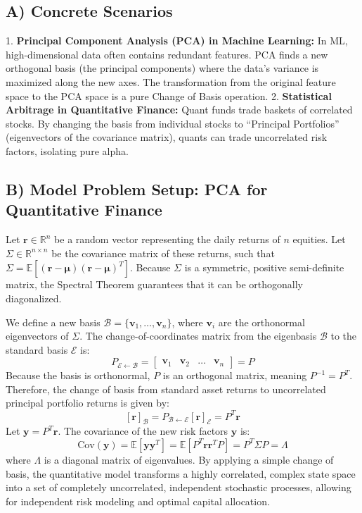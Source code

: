 \documentclass[11pt]{article}
\begin{document}
\subsection{A) Concrete Scenarios}
1. \textbf{Principal Component Analysis (PCA) in Machine Learning:} In ML, high-dimensional data often contains redundant features. PCA finds a new orthogonal basis (the principal components) where the data's variance is maximized along the new axes. The transformation from the original feature space to the PCA space is a pure Change of Basis operation.
2. \textbf{Statistical Arbitrage in Quantitative Finance:} Quant funds trade baskets of correlated stocks. By changing the basis from individual stocks to ``Principal Portfolios'' (eigenvectors of the covariance matrix), quants can trade uncorrelated risk factors, isolating pure alpha.

\subsection{B) Model Problem Setup: PCA for Quantitative Finance}
Let $\mathbf{r} \in \mathbb{R}^n$ be a random vector representing the daily returns of $n$ equities. Let $\Sigma \in \mathbb{R}^{n \times n}$ be the covariance matrix of these returns, such that $\Sigma = \mathbb{E}[(\mathbf{r} - \boldsymbol{\mu})(\mathbf{r} - \boldsymbol{\mu})^T]$. Because $\Sigma$ is a symmetric, positive semi-definite matrix, the Spectral Theorem guarantees that it can be orthogonally diagonalized.

We define a new basis $\mathcal{B} = \{\mathbf{v}_1, \dots, \mathbf{v}_n\}$, where $\mathbf{v}_i$ are the orthonormal eigenvectors of $\Sigma$. The change-of-coordinates matrix from the eigenbasis $\mathcal{B}$ to the standard basis $\mathcal{E}$ is:
\[ P_{\mathcal{E} \leftarrow \mathcal{B}} = \begin{bmatrix} \mathbf{v}_1 & \mathbf{v}_2 & \dots & \mathbf{v}_n \end{bmatrix} = P \]
Because the basis is orthonormal, $P$ is an orthogonal matrix, meaning $P^{-1} = P^T$. Therefore, the change of basis from standard asset returns to uncorrelated principal portfolio returns is given by:
\[ [\mathbf{r}]_{\mathcal{B}} = P_{\mathcal{B} \leftarrow \mathcal{E}} [\mathbf{r}]_{\mathcal{E}} = P^T \mathbf{r} \]
Let $\mathbf{y} = P^T \mathbf{r}$. The covariance of the new risk factors $\mathbf{y}$ is:
\[ \text{Cov}(\mathbf{y}) = \mathbb{E}[\mathbf{y}\mathbf{y}^T] = \mathbb{E}[P^T \mathbf{r} \mathbf{r}^T P] = P^T \Sigma P = \Lambda \]
where $\Lambda$ is a diagonal matrix of eigenvalues. By applying a simple change of basis, the quantitative model transforms a highly correlated, complex state space into a set of completely uncorrelated, independent stochastic processes, allowing for independent risk modeling and optimal capital allocation.
\end{document}
